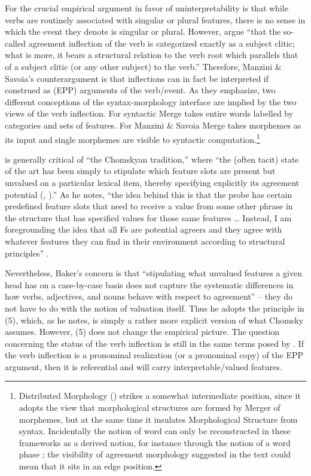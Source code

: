 \documentclass[output=paper]{langsci/langscibook}
\begin{document}
For \citet{Chomsky1995} the crucial empirical argument in favor of uninterpretability is that while verbs are routinely associated with singular or plural features, there is no sense in which the event they denote is singular or plural. However, \citet[21]{Manzini2007} argue “that the so-called agreement inflection of the verb is categorized exactly as a subject clitic; what is more, it bears a structural relation to the verb root which parallels that of a subject clitic (or any other subject) to the verb.” Therefore, Manzini \& Savoia’s counterargument is that inflections can in fact be interpreted if construed as (EPP) arguments of the verb\slash event. As they emphasize, two different conceptions of the syntax-morphology interface are implied by the two views of the verb inflection. For \citet{Chomsky1995} syntactic Merge takes entire words labelled by categories and sets of features. For Manzini \& Savoia Merge takes morphemes as its input and single morphemes are visible to syntactic computation.\footnote{Distributed Morphology (\citealt{Halle1993}) strikes a somewhat intermediate position, since it adopts the view that morphological structures are formed by Merger of morphemes, but at the same time it insulates Morphological Structure from syntax. Incidentally the notion of word can only be reconstructed in these frameworks as a derived notion, for instance through the notion of a word phase \citep{Marantz2007}; the visibility of agreement morphology suggested in the text could mean that it sits in an edge position.} 

\citet[4]{Baker2008} is generally critical of “the Chomskyan tradition,” where “the (often tacit) state of the art has been simply to stipulate which feature slots are present but unvalued on a particular lexical item, thereby specifying explicitly its agreement potential (\citealt{Chomsky2000}, \citealt{Chomsky2001Derivation}).” As he notes, “the idea behind this is that the probe has certain predefined feature slots that need to receive a value from some other phrase in the structure that has specified values for those same features … Instead, I am foregrounding the idea that all Fs are potential agreers and they agree with whatever features they can find in their environment according to structural principles” \citep[44]{Baker2008}.{}  

Nevertheless, Baker’s concern is that “stipulating what unvalued features a given head has on a case-by-case basis does not capture the systematic differences in how verbs, adjectives, and nouns behave with respect to agreement” – they do not have to do with the notion of valuation itself. Thus he adopts the principle in (5), which, as he notes, is simply a rather more explicit version of what Chomsky assumes. However, (5) does not change the empirical picture. The question concerning the status of the verb inflection is still in the same terms posed by \citet{Manzini2007}. If the verb inflection is a pronominal realization (or a pronominal copy) of the EPP argument, then it is referential and will carry interpretable\slash valued features.
\end{document}
